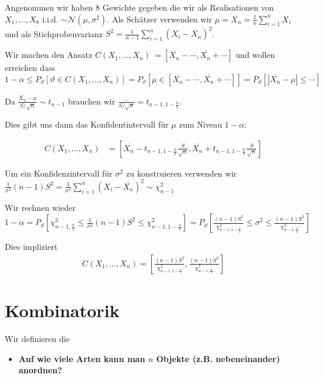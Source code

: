 \documentclass[25pt]{sciposter}
\begin{document}
\begin{multicols}{3}
		Angenommen wir haben 8 Gewichte gegeben die wir als Realisationen von $X_1,\ldots,X_8$ i.i.d. $\sim \mathcal{N}(\mu,\sigma^2)$. Als Schätzer verwenden wir $\mu = \overline{X_n} = \frac{1}{n} \sum_{i=1}^{n} X_i$ und als Stichprobenvarianz $S^2 = \frac{1}{n-1} \sum_{i=1}^{n} (X_i - \overline{X_n})^2$.
		
		Wir machen den Ansatz $C(X_1,\ldots,X_n) \ = \left[\overline{X_n} - \cdots , \overline{X_n} + \cdots \right]$ und wollen erreichen dass $1-\alpha \leq 	P_{\vartheta} \left[\vartheta \in C(X_1,\ldots,X_n) \right] = 	P_{\vartheta} \left[\mu  \in \left[\overline{X_n} - \cdots , \overline{X_n} + \cdots\right] \right] = P_{\vartheta} \left[ |\overline{X_n} - \mu| \leq \cdots \right]$
		
		Da $\frac{\overline{X_n} - \mu}{S/\sqrt{n}} \sim t_{n-1}$ brauchen wir $\frac{...}{S/\sqrt{n}} = t_{n-1,1-\frac{\alpha}{2}}$.
		
		Dies gibt uns dann das Konfidentintervall für $\mu$ zum Niveau $1-\alpha$:
		
		\begin{align*}
			C(X_1,\ldots,X_n) &= \left[ \overline{X_n} -t_{n-1,1-\frac{\alpha}{2}}\frac{S}{\sqrt{n}} , \overline{X_n} +t_{n-1,1-\frac{\alpha}{2}}\frac{S}{\sqrt{n}}   \right]
		\end{align*}
		
		Um ein Konfidenzintervall für $\sigma^2$ zu konstruieren verwenden wir $\frac{1}{\sigma^2} (n-1)S^2 = \frac{1}{\sigma^2}\sum_{i=1}^{n} (X_i- \overline{X_n})^2 \sim \chi_{n-1}^2$
		
		Wir rechnen wieder $1-\alpha = P_{\vartheta} \left[ \chi_{n-1,\frac{\alpha}{2}}^2 \leq \frac{1}{\sigma^2} (n-1)S^2 \leq \chi_{n-1,1-\frac{\alpha}{2}}^2 \right] = P_{\vartheta} \left[ \frac{(n-1)S^2}{\chi_{n-1,1-\frac{\alpha}{2}}^2} \leq \sigma^2 \leq \frac{(n-1)S^2}{\chi_{n-1,\frac{\alpha}{2}}^2}  \right]$
		
		Dies impliziert 
		\begin{align*}
			C(X_1,\ldots,X_n) = \left[ \frac{(n-1)S^2}{\chi_{n-1,1-\frac{\alpha}{2}}^2} , \frac{(n-1)S^2}{\chi_{n-1,\frac{\alpha}{2}}^2}\right]
		\end{align*}
		\section {Kombinatorik}
		
		Wir definieren die 
		
		\begin{itemize}
			\item \textbf{Auf wie viele Arten kann man $n$ Objekte (z.B. nebeneinander) anordnen?}
			

\end{itemize}
\end{multicols}
\end{document}
